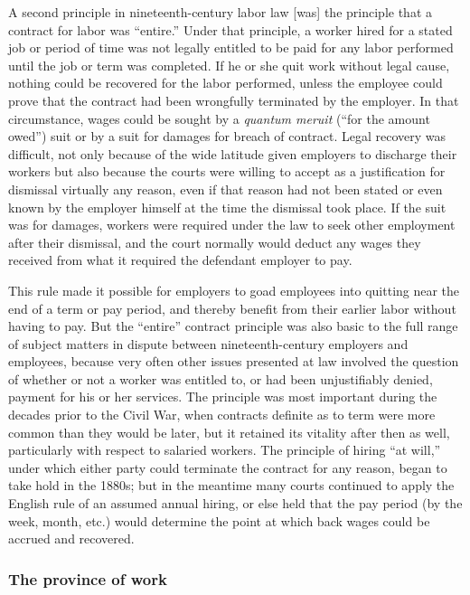 \documentclass[
  letterpaper,
  11pt,
  DIV=9,
  openright]{scrbook}
\begin{document}
A second principle in nineteenth-century labor law {[}was{]} the
principle that a contract for labor was ``entire.'' Under that
principle, a worker hired for a stated job or period of time was not
legally entitled to be paid for any labor performed until the job or
term was completed. If he or she quit work without legal cause, nothing
could be recovered for the labor performed, unless the employee could
prove that the contract had been wrongfully terminated by the employer.
In that circumstance, wages could be sought by a \emph{quantum meruit}
(``for the amount owed'') suit or by a suit for damages for breach of
contract. Legal recovery was difficult, not only because of the wide
latitude given employers to discharge their workers but also because the
courts were willing to accept as a justification for dismissal virtually
any reason, even if that reason had not been stated or even known by the
employer himself at the time the dismissal took place. If the suit was
for damages, workers were required under the law to seek other
employment after their dismissal, and the court normally would deduct
any wages they received from what it required the defendant employer to
pay.

This rule made it possible for employers to goad employees into quitting
near the end of a term or pay period, and thereby benefit from their
earlier labor without having to pay. But the ``entire'' contract
principle was also basic to the full range of subject matters in dispute
between nineteenth-century employers and employees, because very often
other issues presented at law involved the question of whether or not a
worker was entitled to, or had been unjustifiably denied, payment for
his or her services. The principle was most important during the decades
prior to the Civil War, when contracts definite as to term were more
common than they would be later, but it retained its vitality after then
as well, particularly with respect to salaried workers. The principle of
hiring ``at will,'' under which either party could terminate the
contract for any reason, began to take hold in the 1880s; but in the
meantime many courts continued to apply the English rule of an assumed
annual hiring, or else held that the pay period (by the week, month,
etc.) would determine the point at which back wages could be accrued and
recovered.

\subsubsection{The province of work}\label{the-province-of-work}
\end{document}
